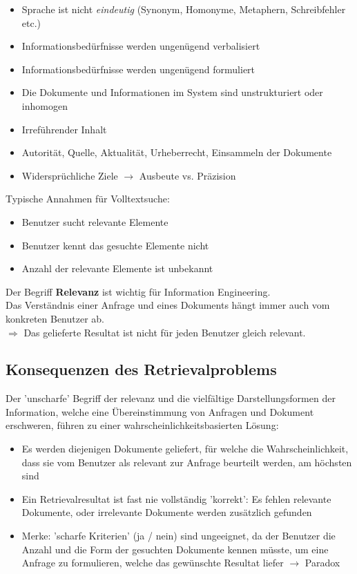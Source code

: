 \documentclass{report}
\theoremstyle{definition}
\theoremstyle{example}
\begin{document}
\begin{itemize}
   \item Sprache ist nicht \textit{eindeutig} (Synonym, Homonyme, Metaphern, Schreibfehler etc.) 
   \item Informationsbedürfnisse werden ungenügend verbalisiert
   \item Informationsbedürfnisse werden ungenügend formuliert
   \item Die Dokumente und Informationen im System sind unstrukturiert oder inhomogen
   \item Irreführender Inhalt
   \item Autorität, Quelle, Aktualität, Urheberrecht, Einsammeln der Dokumente
   \item Widersprüchliche Ziele $\rightarrow$ Ausbeute vs. Präzision
\end{itemize}

Typische Annahmen für Volltextsuche:
\begin{itemize}
   \item Benutzer sucht relevante Elemente
   \item Benutzer kennt das gesuchte Elemente nicht
   \item Anzahl der relevante Elemente ist unbekannt
\end{itemize}

Der Begriff \textbf{Relevanz} ist wichtig für Information Engineering.\\
Das Verständnis einer Anfrage und eines Dokuments hängt immer auch vom konkreten Benutzer ab. \\
$\Rightarrow$ Das gelieferte Resultat ist nicht für jeden Benutzer gleich relevant.

\subsection{Konsequenzen des Retrievalproblems}
Der 'unscharfe' Begriff der relevanz und die vielfältige Darstellungsformen der Information, welche eine Übereinstimmung von Anfragen und Dokument erschweren,
führen zu einer wahrscheinlichkeitsbasierten Lösung:
\begin{itemize}
   \item Es werden diejenigen Dokumente geliefert, für welche die Wahrscheinlichkeit, dass sie vom Benutzer als relevant zur Anfrage beurteilt werden, am höchsten sind
   \item Ein Retrievalresultat ist fast nie vollständig 'korrekt': Es fehlen relevante Dokumente, oder irrelevante Dokumente werden zusätzlich gefunden
   \item Merke: 'scharfe Kriterien' (ja / nein) sind ungeeignet, da der Benutzer die Anzahl und die Form der gesuchten Dokumente kennen müsste, um eine Anfrage zu formulieren, welche das gewünschte Resultat liefer $\rightarrow$ Paradox
\end{itemize}
\end{document}
